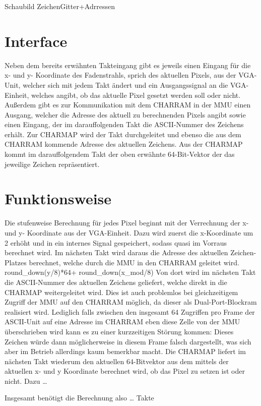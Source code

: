 Schaubild ZeichenGitter+Adrressen


\section{Interface}
Neben dem bereits erwähnten Takteingang gibt es jeweils einen Eingang für die x- und y- Koordinate des Fadenstrahls, sprich des aktuellen Pixels, aus der VGA-Unit, welcher sich mit jedem Takt ändert und ein Ausgangssignal an die VGA-Einheit, welches angibt, ob das aktuelle Pixel gesetzt werden soll oder nicht. Außerdem gibt es zur Kommunikation mit dem CHARRAM in der MMU einen Ausgang, welcher die Adresse des aktuell zu berechnenden Pixels angibt sowie einen Eingang, der im darauffolgenden Takt die ASCII-Nummer des Zeichens erhält.
Zur CHARMAP wird der Takt durchgeleitet und ebenso die aus dem CHARRAM kommende Adresse des aktuellen Zeichens. Aus der CHARMAP kommt im darauffolgendem Takt der oben erwähnte 64-Bit-Vektor der das jeweilige Zeichen repräsentiert.

\section{Funktionsweise}
Die stufenweise Berechnung für jedes Pixel beginnt mit der Verrechnung der x- und y- Koordinate aus der VGA-Einheit. Dazu wird zuerst die x-Koordinate um 2 erhöht und in ein internes Signal gespeichert, sodass quasi im Vorraus berechnet wird.
Im nächsten Takt wird daraus die Adresse des aktuellen Zeichen-Platzes berechnet, welche durch die MMU in den CHARRAM geleitet wird.  round_down(y/8)*64+ round_down(x_mod/8)
Von dort wird im nächsten Takt die ASCII-Nummer des aktuellen Zeichens geliefert, welche direkt in die CHARMAP weitergeleitet wird. Dies ist auch problemlos bei gleichzeitigem Zugriff der MMU auf den CHARRAM möglich, da dieser als Dual-Port-Blockram realisiert wird. Lediglich falls zwischen den insgesamt 64 Zugriffen pro Frame der ASCII-Unit auf eine Adresse im CHARRAM eben diese Zelle von der MMU überschrieben wird kann es zu einer kurzzeitigen Störung kommen: Dieses Zeichen würde dann möglicherweise in diesem Frame falsch dargestellt, was sich aber im Betrieb allerdings kaum bemerkbar macht.
Die CHARMAP liefert im nächsten Takt wiederum den aktuellen 64-Bitvektor aus dem mittels der aktuellen x- und y Koordinate berechnet wird, ob das Pixel zu setzen ist oder nicht. Dazu …

Insgesamt benötigt die Berechnung also … Takte
